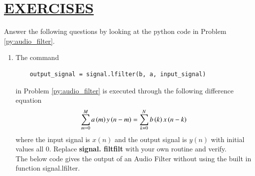 \documentclass[journal,12pt,twocolumn]{IEEEtran}
\theoremstyle{remark}
\renewcommand\thesection{\arabic{section}}
\numberwithin{equation}{subsection}
\begin{document}
\section{\underline{\textbf{EXERCISES}}}
\noindent Answer the following questions by looking at the python code in Problem \ref{py:audio_filter}.
\begin{enumerate}[label=\thesection.\arabic*]
\item
The command
\begin{lstlisting}
	output_signal = signal.lfilter(b, a, input_signal)
	\end{lstlisting}
in Problem \ref{py:audio_filter} is executed through the following difference equation
\begin{equation}
\label{eq:iir_filter_gen}
 \sum _{m=0}^{M}a\left(m\right)y\left(n-m\right)=\sum _{k=0}^{N}b\left(k\right)x\left(n-k\right) 
\end{equation}
%
where the input signal is $x(n)$ and the output signal is $y(n)$ with initial values all 0. Replace
\textbf{signal. filtfilt} with your own routine and verify.\\

\solution The below code gives the output of an Audio Filter without using the built in function signal.lfilter.


\end{enumerate}
\end{document}
